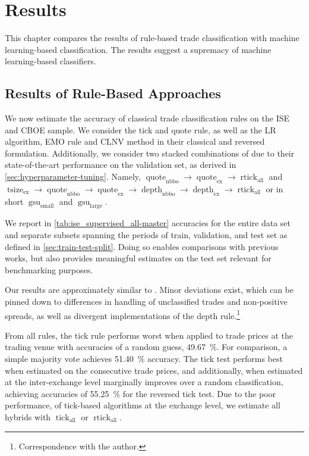 \section{Results}\label{sec:results}

This chapter compares the results of rule-based trade classification with machine learning-based classification. The results suggest a supremacy of machine learning-based classifiers.

\subsection{Results of Rule-Based Approaches}\label{sec:result-of-rule-based-approaches}

We now estimate the accuracy of classical trade classification rules on the \gls{ISE} and \gls{CBOE} sample. We consider the tick and quote rule, as well as the \gls{LR} algorithm, \gls{EMO} rule and \gls{CLNV} method in their classical and reversed formulation. Additionally, we consider two stacked combinations of \textcite[][12--14]{grauerOptionTradeClassification2022} due to their state-of-the-art performance on the validation set, as derived in \cref{sec:hyperparameter-tuning}. Namely, $\operatorname{quote}_{\mathrm{nbbo}} \to \operatorname{quote}_{\mathrm{ex}} \to \operatorname{rtick}_{\mathrm{all}}$ and $\operatorname{tsize}_{\mathrm{ex}} \to \operatorname{quote}_{\mathrm{nbbo}} \to \operatorname{quote}_{\mathrm{ex}} \to \operatorname{depth}_{\mathrm{nbbo}} \to \operatorname{depth}_{\mathrm{ex}} \to \operatorname{rtick}_{\mathrm{all}}$ or in short $\operatorname{gsu}_{\mathrm{small}}$ and $\operatorname{gsu}_{\mathrm{large}}$.

We report in \cref{tab:ise_supervised_all-master} accuracies for the entire data set and separate subsets spanning the periods of train, validation, and test set as defined in \cref{sec:train-test-split}. Doing so enables comparisons with previous works, but also provides meaningful estimates on the test set relevant for benchmarking purposes.

Our results are approximately similar to \textcite[][29--33]{grauerOptionTradeClassification2022}. Minor deviations exist, which can be pinned down to differences in handling of unclassified trades and non-positive spreads, as well as divergent implementations of the depth rule.\footnote{Correspondence with the author.}

From all rules, the tick rule performs worst when applied to trade prices at the trading venue with accuracies of a random guess, \SI{49.67}{\percent}. For comparison, a simple majority vote achieves \SI{51.40}{\percent} accuracy. The tick test performs best when estimated on the consecutive trade prices, and additionally, when estimated at the inter-exchange level marginally improves over a random classification, achieving accuracies of \SI{55.25}{\percent} for the reversed tick test. Due to the poor performance, of tick-based algorithms at the exchange level, we estimate all hybrids with $\operatorname{tick}_{\mathrm{all}}$ or $\operatorname{rtick}_{\mathrm{all}}$.

